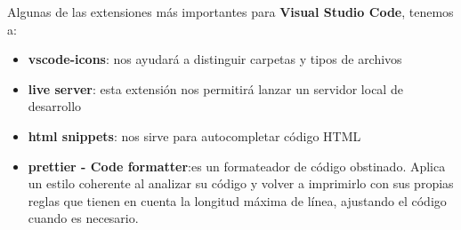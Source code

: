 \newpage
Algunas de las extensiones más importantes para \textbf{Visual Studio Code}, tenemos a:
\begin{itemize}
    \item  \textbf{vscode-icons}: nos ayudará a distinguir carpetas y tipos de archivos
    \item  \textbf{live server}: esta extensión nos permitirá lanzar un servidor local de desarrollo
    \item  \textbf{html snippets}: nos sirve para autocompletar código HTML
    \item  \textbf{prettier - Code formatter}:es un formateador de código obstinado. Aplica un estilo coherente al analizar su código y volver a imprimirlo con sus propias reglas que tienen en cuenta la longitud máxima de línea, ajustando el código cuando es necesario.
\end{itemize}

